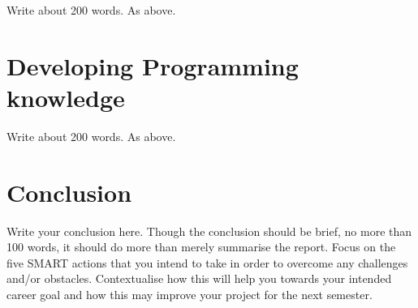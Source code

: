 \documentclass{scrartcl}
\begin{document}
Write about 200 words. As above.

\section{Developing Programming knowledge}

Write about 200 words. As above.


\section{Conclusion}

Write your conclusion here. Though the conclusion should be brief, no more than 100 words, it should do more than merely summarise the report. Focus on the five SMART actions that you intend to take in order to overcome any challenges and/or obstacles. Contextualise how this will help you towards your intended career goal and how this may improve your project for the next semester.



\end{document}
